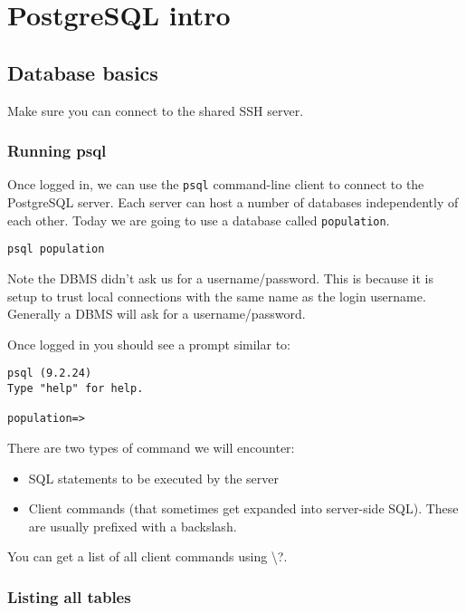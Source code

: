 \chapter{PostgreSQL intro}

\section{Database basics}\label{database-basics}

Make sure you can connect to the shared SSH server.

\subsection{Running psql}\label{running-psql}

Once logged in, we can use the \texttt{psql} command-line client to connect to the PostgreSQL server.
Each server can host a number of databases independently of each other.
Today we are going to use a database called \texttt{population}.

\begin{verbatim}
psql population
\end{verbatim}

Note the DBMS didn't ask us for a username/password.
This is because it is setup to trust local connections with the same name as the login username.
Generally a DBMS will ask for a username/password.

Once logged in you should see a prompt similar to:

\begin{verbatim}
psql (9.2.24)
Type "help" for help.

population=> 
\end{verbatim}

There are two types of command we will encounter:

\begin{itemize}
\item
  SQL statements to be executed by the server
\item
  Client commands (that sometimes get expanded into server-side SQL).
  These are usually prefixed with a backslash.
\end{itemize}

You can get a list of all client commands using \textbackslash{}?.

\subsection{Listing all tables}\label{listing-all-tables}

